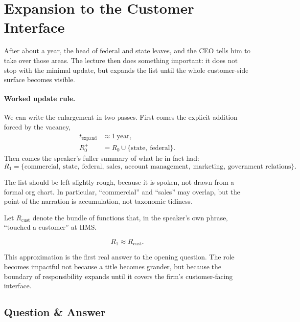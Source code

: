 \section{Expansion to the Customer Interface}

After about a year, the head of federal and state leaves, and the CEO tells him to take over those areas. The lecture then does something important: it does not stop with the minimal update, but expands the list until the whole customer-side surface becomes visible.

\paragraph{Worked update rule.}
We can write the enlargement in two passes. First comes the explicit addition forced by the vacancy,
\begin{align}
t_{\mathrm{expand}} &\approx 1\ \text{year},\\
R_0^{+} &= R_0 \cup \{\text{state},\ \text{federal}\}.
\end{align}
Then comes the speaker's fuller summary of what he in fact had:
\begin{equation}
R_1 =
\{\text{commercial},\ \text{state},\ \text{federal},\ \text{sales},\ \text{account management},\ \text{marketing},\ \text{government relations}\}.
\end{equation}

The list should be left slightly rough, because it is spoken, not drawn from a formal org chart. In particular, ``commercial'' and ``sales'' may overlap, but the point of the narration is accumulation, not taxonomic tidiness.

\begin{definition}
Let \(R_{\mathrm{cust}}\) denote the bundle of functions that, in the speaker's own phrase, ``touched a customer'' at HMS.
\end{definition}

\begin{equation}
R_1 \approx R_{\mathrm{cust}}.
\end{equation}

This approximation is the first real answer to the opening question. The role becomes impactful not because a title becomes grander, but because the boundary of responsibility expands until it covers the firm's customer-facing interface.

\subsection{Question \& Answer}

